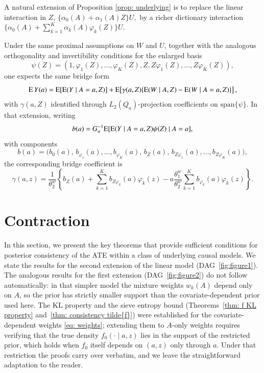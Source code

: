 \begin{remark}
A natural extension of Proposition \ref{prop: underlying} is to replace the linear interaction in \(Z\), $\{\alpha_0(A)+\alpha_1(A)Z\}U,$ by a richer dictionary interaction
$\big\{\alpha_0(A)+\sum_{k=1}^K \alpha_k(A)\varphi_k(Z)\big\}U$. 

Under the same proximal assumptions on \(W\) and \(U\), together with the analogous orthogonality and invertibility conditions for the enlarged basis
\[
\psi(Z)=(1,\varphi_1(Z),\ldots,\varphi_K(Z),Z,Z\varphi_1(Z),\ldots,Z\varphi_K(Z)),
\]
one expects the same bridge form
\[
\mathrm{E}\, Y(a)
=
\mathrm{E}[\mathrm{E}(Y\mid A=a,Z)]
+
\mathrm{E}\!\left[\gamma(a,Z)\{\mathrm{E}(W\mid A,Z)-\mathrm{E}(W\mid A=a,Z)\}\right],
\]
with \(\gamma(a,Z)\) identified through \(L_2(Q_a)\)-projection coefficients on \(\mathrm{span}\{\psi\}\). In that extension, writing
\[
b(a)=G_a^{-1}\mathrm{E}[\mathrm{E}(Y\mid A=a,Z)\psi(Z)\mid A=a],
\]
with components
\[
b(a)=\big(b_0(a),\,b_{\varphi_1}(a),\ldots,b_{\varphi_K}(a),\,b_Z(a),\,b_{Z\varphi_1}(a),\ldots,b_{Z\varphi_K}(a)\big),
\]
the corresponding bridge coefficient is
\[
\gamma(a,z)
=
\frac{1}{\theta_2^w}
\left\{
b_Z(a)
+
\sum_{k=1}^K b_{Z\varphi_k}(a)\varphi_k(z)
-
a\frac{\theta_1^w}{\theta_2^w}
\sum_{k=1}^K b_{\varphi_k}(a)\varphi_k(z)
\right\}.
\]
\end{remark}




\section{Contraction}\label{sec: estimation}


In this section, we present the key theorems that provide sufficient conditions for posterior consistency of the ATE within a class of underlying causal models. We state the results for the second extension of the linear model (DAG~\ref{fig:figure1}). The analogous results for the first extension (DAG~\ref{fig:figure2}) do not follow automatically: in that simpler model the mixture weights $w_k(A)$ depend only on $A$, so the prior has strictly smaller support than the covariate-dependent prior used here. The KL property and the sieve entropy bound (Theorems~\ref{thm: f KL property} and~\ref{thm: consistency tilde{f}}) were established for the covariate-dependent weights \eqref{eq: weights}; extending them to $A$-only weights requires verifying that the true density $f_0(\cdot\mid a,z)$ lies in the support of the restricted prior, which holds when $f_0$ itself depends on $(a,z)$ only through $a$. Under that restriction the proofs carry over verbatim, and we leave the straightforward adaptation to the reader.


